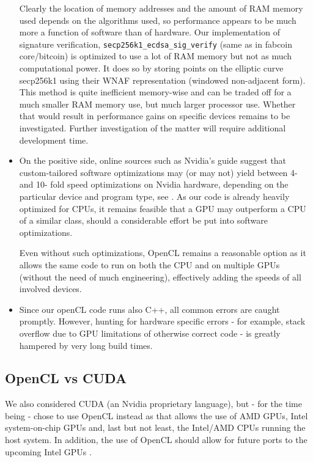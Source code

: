 \documentclass{article}
\begin{document}
\begin{itemize}
Clearly the location of memory addresses and the amount of RAM memory used depends on the algorithms used, so performance appears to be much more a function of software than of hardware. Our implementation of signature verification, \verb|secp256k1_ecdsa_sig_verify| (same as in fabcoin core/bitcoin) is optimized to use a lot of RAM memory but not as much computational power. It does so by storing points on the elliptic curve secp256k1 using their WNAF representation (windowed non-adjacent form). This method is quite inefficient memory-wise and can be traded off for a much smaller RAM memory use, but much larger processor use. Whether that would result in performance gains on specific devices remains to be investigated. Further investigation of the matter will require additional development time.

\item On the positive side,  online sources such as Nvidia's guide \cite{NVIDIA:openCLBestPractices} suggest that custom-tailored software optimizations may (or may not) yield between 4- and 10- fold speed optimizations on Nvidia hardware, depending on the particular device and program type, see \cite[page 22]{NVIDIA:openCLBestPractices}. As our code is already heavily optimized for CPUs, it remains feasible that a GPU may outperform a CPU of a similar class, should a considerable effort be put into software optimizations. 

Even without such optimizations, OpenCL remains a reasonable option as it allows the same code to run on both the CPU and on multiple GPUs (without the need of much engineering), effectively adding the speeds of all involved devices. 

\item Since our openCL code runs also C++, all common errors are caught promptly. However, hunting for hardware specific errors - for example, stack overflow due to GPU limitations of otherwise correct code - is greatly hampered by very long build times. 
\end{itemize}


\subsection{OpenCL vs CUDA}
We also considered CUDA (an Nvidia proprietary language), but - for the time being - chose to use OpenCL instead as that allows the use of AMD GPUs, Intel system-on-chip GPUs and, last but not least, the Intel/AMD CPUs running the host system. In addition, the use of OpenCL should allow for future ports to the upcoming Intel GPUs \cite{forbes:IntelGPUupcoming}. 
\end{document}
